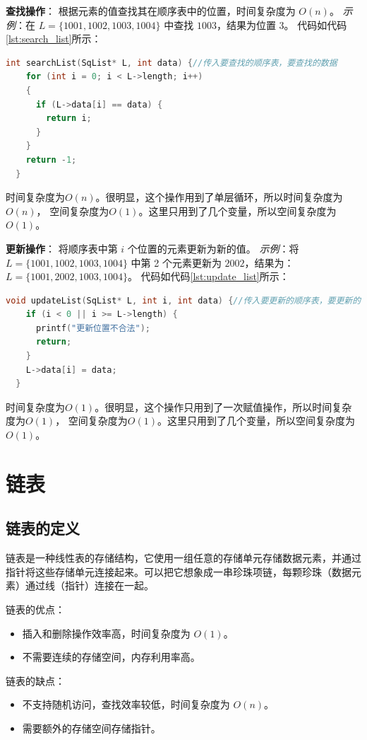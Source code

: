 \documentclass[lang=cn,newtx,10pt,scheme=chinese]{../elegantbook}
\begin{document}
\textbf{查找操作}：
根据元素的值查找其在顺序表中的位置，时间复杂度为 $O(n)$。
\textit{示例}：在 $L = \{1001, 1002, 1003, 1004\}$ 中查找 $1003$，结果为位置 3。
代码如代码\ref{lst:search_list}所示：
\begin{lstlisting}[language=C++, caption={顺序表的查找示例代码}, label={lst:search_list}]
  int searchList(SqList* L, int data) {//传入要查找的顺序表，要查找的数据
    for (int i = 0; i < L->length; i++)
    {
      if (L->data[i] == data) {
        return i;
      }
    }
    return -1;
  }
  \end{lstlisting}
时间复杂度为$O(n)$。很明显，这个操作用到了单层循环，所以时间复杂度为$O(n)$，
空间复杂度为$O(1)$。这里只用到了几个变量，所以空间复杂度为$O(1)$。

\textbf{更新操作}：
将顺序表中第 $i$ 个位置的元素更新为新的值。
\textit{示例}：将 $L = \{1001, 1002, 1003, 1004\}$ 中第 2 个元素更新为 $2002$，结果为：
$L = \{1001, 2002, 1003, 1004\}$。
代码如代码\ref{lst:update_list}所示：
\begin{lstlisting}[language=C++, caption={顺序表的更新示例代码}, label={lst:update_list}]
  void updateList(SqList* L, int i, int data) {//传入要更新的顺序表，要更新的位置，要更新的数据
    if (i < 0 || i >= L->length) {
      printf("更新位置不合法");
      return;
    }
    L->data[i] = data;
  }
  \end{lstlisting}
时间复杂度为$O(1)$。很明显，这个操作只用到了一次赋值操作，所以时间复杂度为$O(1)$，
空间复杂度为$O(1)$。这里只用到了几个变量，所以空间复杂度为$O(1)$。

\section{链表}

\subsection{链表的定义}
链表是一种线性表的存储结构，它使用一组任意的存储单元存储数据元素，并通过指针将这些存储单元连接起来。可以把它想象成一串珍珠项链，每颗珍珠（数据元素）通过线（指针）连接在一起。

链表的优点：
\begin{itemize}
    \item 插入和删除操作效率高，时间复杂度为 $O(1)$。
    \item 不需要连续的存储空间，内存利用率高。
\end{itemize}

链表的缺点：
\begin{itemize}
    \item 不支持随机访问，查找效率较低，时间复杂度为 $O(n)$。
    \item 需要额外的存储空间存储指针。
\end{itemize}
\end{document}

